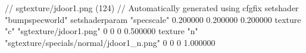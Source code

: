 // sgtexture/jdoor1.png (124)
// Automatically generated using cfgfix
setshader "bumpspecworld"
setshaderparam "specscale" 0.200000 0.200000 0.200000
texture "c" "sgtexture/jdoor1.png" 0 0 0 0.500000
texture "n" "sgtexture/specials/normal/jdoor1_n.png" 0 0 0 1.000000
